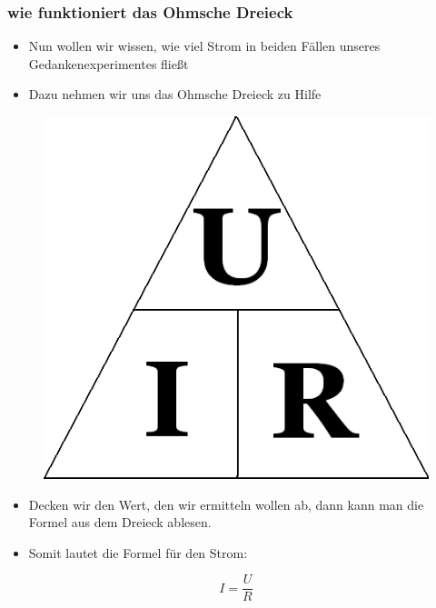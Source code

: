 \begin{frame}
	\frametitle{wie funktioniert das Ohmsche Dreieck}
	\begin{itemize}
		\item	Nun wollen wir wissen, wie viel Strom in beiden Fällen unseres Gedankenexperimentes fließt
		\item	Dazu nehmen wir uns das Ohmsche Dreieck zu Hilfe
	\end{itemize}
	\begin{center}
 		   \begin{figure}
    				\includegraphics[width=\textwidth,height=.2\textheight,keepaspectratio]{e03/Ohm_law_triangle.png}
    \end{figure}
 	\end{center}
 	\begin{itemize}
 		\item	Decken wir den Wert, den wir ermitteln wollen ab, dann kann man die Formel aus dem Dreieck ablesen.
 		\item	Somit lautet die Formel für den Strom:
 	\end{itemize}
 	\begin{equation}
 		I = \frac{U}{R}
 		\label{equ:Strom}
 	\end{equation}
\end{frame}

